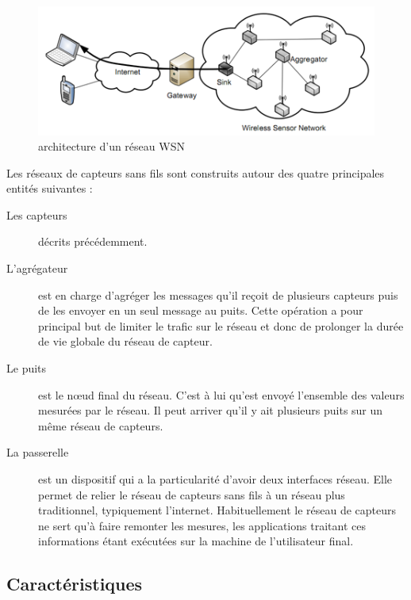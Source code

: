 \begin{figure}[h]
\centering
\includegraphics[scale=0.8]{Intro/archiWSN}
\caption{\label{archiWSN} architecture d’un réseau WSN}
\end{figure}

Les réseaux de capteurs sans fils sont construits autour des quatre principales entités suivantes :

\begin{description}
\item[Les capteurs] décrits précédemment.

\item[L’agrégateur] est en charge d’agréger les messages qu’il reçoit de plusieurs capteurs puis de les envoyer en un seul message au puits. Cette opération a pour principal but de limiter le trafic sur le réseau et donc de prolonger la durée de vie globale du réseau de capteur.

\item[Le puits] est le nœud final  du réseau. C’est à lui qu’est  envoyé l’ensemble des valeurs mesurées par le réseau.  Il peut arriver qu’il y ait plusieurs puits sur un même réseau de capteurs.

\item[La passerelle] est un dispositif qui a la particularité d’avoir deux interfaces réseau. Elle permet de relier le réseau de capteurs  sans fils  à un réseau plus traditionnel, typiquement l’internet. Habituellement  le réseau de capteurs  ne sert  qu’à  faire remonter les 
mesures, les applications traitant ces informations étant exécutées sur la machine 
de l’utilisateur final.
\end{description}



\subsection{Caractéristiques}

